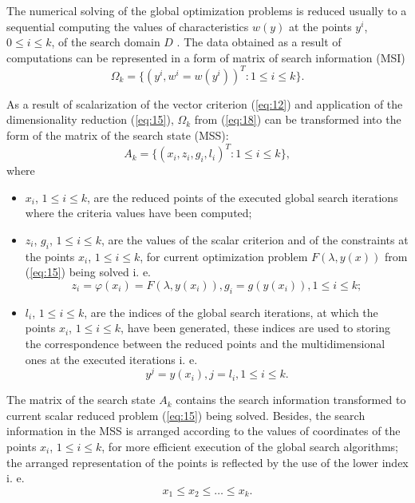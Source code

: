 \documentclass{svproc}
\begin{document}
The numerical solving of the global optimization problems is reduced usually to a sequential computing the values of characteristics $w(y)$ at the points $y^i$, $0\leq i \leq k$, of the search domain $D$ \cite{x18,x22,x23,x24,x25}. The data obtained as a result of computations can be represented in a form of matrix of search information (MSI)
\begin{equation}
\label{eq:18}
\Omega_k=\{(y^i,w^i=w(y^i ) )^T:1 \leq i \leq k\}.
\end{equation}

As a result of scalarization of the vector criterion (\ref{eq:12}) and application of the dimensionality reduction (\ref{eq:15}), $\Omega_k$ from (\ref{eq:18}) can be transformed into the form of the matrix of the search state (MSS):
\begin{equation}
\label{eq:19}
A_k=\{(x_i,z_i,g_i,l_i )^T:1 \leq i \leq k\},
\end{equation}
where
\begin{itemize}
	\item $x_i$, $1 \leq i \leq k$, are the reduced points of the executed global search iterations where the criteria values have been computed; 
	\item $z_i$, $g_i$, $1 \leq i \leq k$, are the values of the scalar criterion and of the constraints at the points $x_i$, $1 \leq i \leq k$, for current optimization problem $F(\lambda,y(x))$ from (\ref{eq:15}) being solved i. e.
\begin{equation}
z_i = \varphi(x_i) =F(\lambda,y(x_i)),  g_i=g(y(x_i )),  1\leq i \leq k;
\end{equation}
	\item $l_i$, $1 \leq i \leq k$, are the indices of the global search iterations, at which the points $x_i$, $1 \leq i \leq k$, have been generated, these indices are used to storing the correspondence between the reduced points and the multidimensional ones at the executed iterations i. e.
\begin{equation}
y^j = y(x_i), j = l_i, 1 \leq i \leq k.
\end{equation}

\end{itemize}

The matrix of the search state $A_k$ contains the search information transformed to current scalar reduced problem (\ref{eq:15}) being solved. Besides, the search information in the MSS is arranged according to the values of coordinates of the points $x_i$, $1 \leq i \leq k$, for more efficient execution of the global search algorithms; the arranged representation of the points is reflected by the use of the lower index i. e.
\begin{equation}
x_1 \leq x_2 \leq \dots \leq x_k.
\end{equation}
\end{document}
